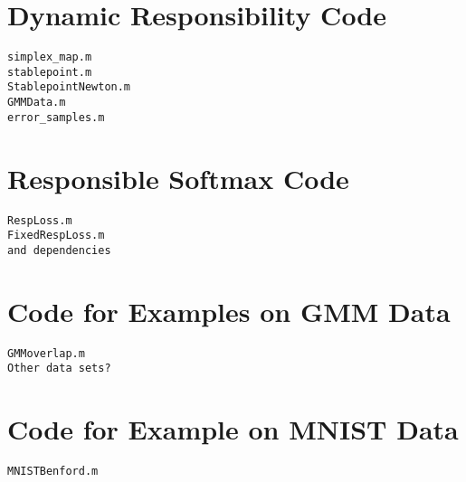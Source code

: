 \renewcommand{\thesubsection}{\Alph{subsection}}

\chapter{Dynamic Responsibility Code}
\begin{verbatim}
simplex_map.m
stablepoint.m
StablepointNewton.m
GMMData.m
error_samples.m
\end{verbatim}

\chapter{Responsible Softmax Code}
\begin{verbatim}
RespLoss.m 
FixedRespLoss.m
and dependencies
\end{verbatim}
\chapter{Code for Examples on GMM Data}
\begin{verbatim}
GMMoverlap.m 
Other data sets?
\end{verbatim}
\chapter{Code for Example on MNIST Data}
\begin{verbatim}
MNISTBenford.m
\end{verbatim}